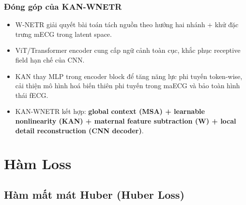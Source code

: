 \documentclass[../DoAn.tex]{subfiles}
\begin{document}

\subsubsection{Đóng góp của KAN-WNETR}
\begin{itemize}
  \item W-NETR giải quyết bài toán tách nguồn theo hướng hai nhánh + khử đặc trưng mECG trong latent space.
  \item ViT/Transformer encoder cung cấp ngữ cảnh toàn cục, khắc phục receptive field hạn chế của CNN.
  \item KAN thay MLP trong encoder block để tăng năng lực phi tuyến token-wise, cải thiện mô hình hoá biến thiên phi tuyến trong maECG và bảo toàn hình thái fECG.
  \item KAN-WNETR kết hợp: \textbf{global context (MSA) + learnable nonlinearity (KAN) + maternal feature subtraction (W) + local detail reconstruction (CNN decoder)}.
\end{itemize}

\section{Hàm Loss}
\subsection{Hàm mất mát Huber (Huber Loss)}
\end{document}
